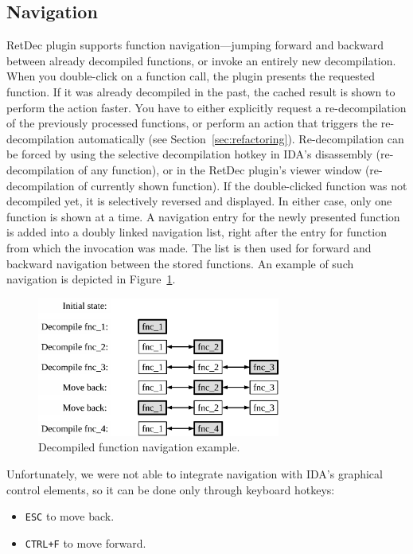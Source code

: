 \documentclass[pdftex, a4paper,12pt, oneside, svgnames]{article}
\begin{document}
\subsection{Navigation}
\label{sec:navigation}
RetDec plugin supports function navigation---jumping forward and backward between already decompiled functions, or invoke an entirely new decompilation. When you double-click on a function call, the plugin presents the requested function. If it was already decompiled in the past, the cached result is shown to perform the action faster. You have to either explicitly request a re-decompilation of the previously processed functions, or perform an action that triggers the re-decompilation automatically (see Section~\ref{sec:refactoring}). Re-decompilation can be forced by using the selective decompilation hotkey in IDA's disassembly (re-decompilation of any function), or in the RetDec plugin's viewer window (re-decompilation of currently shown function). If the double-clicked function was not decompiled yet, it is selectively reversed and displayed. In either case, only one function is shown at a time. A navigation entry for the newly presented function is added into a doubly linked navigation list, right after the entry for function from which the invocation was made. The list is then used for forward and backward navigation between the stored functions. An example of such navigation is depicted in Figure~\ref{fig:navigation}.

\begin{figure}[!ht]
	\centering
	\includegraphics[width=8cm]{figures/navigation}
	\caption{Decompiled function navigation example.}
	\label{fig:navigation}
\end{figure}

Unfortunately, we were not able to integrate navigation with IDA's graphical control elements, so it can be done only through keyboard hotkeys:
\begin{itemize}
	\item \texttt{ESC} to move back.
	\item \texttt{CTRL+F} to move forward.
\end{itemize}
\end{document}
